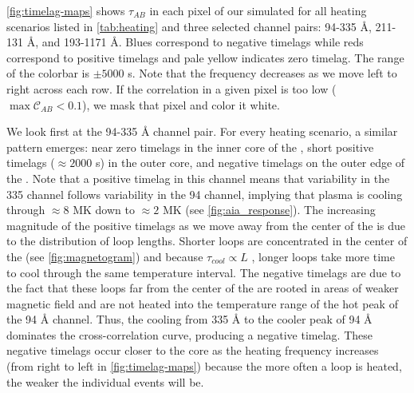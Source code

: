 \autoref{fig:timelag-maps} shows $\tau_{AB}$ in each pixel of our simulated \AR{} for all heating scenarios listed in \autoref{tab:heating} and three selected channel pairs: 94-335 \AA{}, 211-131 \AA{}, and 193-1171 \AA{}. Blues correspond to negative timelags while reds correspond to positive timelags and pale yellow indicates zero timelag. The range of the colorbar is $\pm5000$ s. Note that the frequency decreases as we move left to right across each row. If the correlation in a given pixel is too low ($\max{\mathcal{C}_{AB}}<0.1$), we mask that pixel and color it white. 

We look first at the 94-335 \AA{} channel pair. For every heating scenario, a similar pattern emerges: near zero timelags in the inner core of the \AR{}, short positive timelags ($\approx2000$ s) in the outer core, and negative timelags on the outer edge of the \AR{}. Note that a positive timelag in this channel means that variability in the 335 channel follows variability in the 94 channel, implying that plasma is cooling through $\approx8$ MK down to $\approx2$ MK (see \autoref{fig:aia_response}). The increasing magnitude of the positive timelags as we move away from the center of the \AR{} is due to the distribution of loop lengths. Shorter loops are concentrated in the center of the \AR{} (see \autoref{fig:magnetogram}) and because $\tau_{cool}\propto L$ \citep[see Appendix of][]{cargill_active_2014}, longer loops take more time to cool through the same temperature interval. The negative timelags are due to the fact that these loops far from the center of the \AR{} are rooted in areas of weaker magnetic field and are not heated into the temperature range of the hot peak of the 94 \AA{} channel. Thus, the cooling from 335 \AA{} to the cooler peak of 94 \AA{} dominates the cross-correlation curve, producing a negative timelag. These negative timelags occur closer to the core as the heating frequency increases (from right to left in \autoref{fig:timelag-maps}) because the more often a loop is heated, the weaker the individual events will be. 


